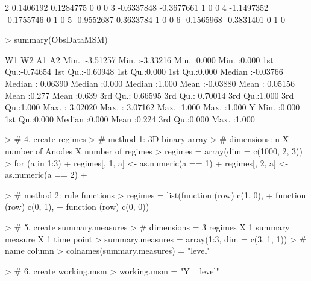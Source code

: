 \documentclass[answers]{exam}
\begin{document}
\begin{solution}
\begin{Schunk}
\begin{Soutput}
2  0.1406192  0.1284775  0  0 0
3 -0.6337848 -0.3677661  1  0 0
4 -1.1497352 -0.1755746  0  1 0
5 -0.9552687  0.3633784  1  0 0
6 -0.1565968 -0.3831401  0  1 0
\end{Soutput}
\begin{Sinput}
> summary(ObsDataMSM)
\end{Sinput}
\begin{Soutput}
       W1                 W2                 A1              A2       
 Min.   :-3.51257   Min.   :-3.33216   Min.   :0.000   Min.   :0.000  
 1st Qu.:-0.74654   1st Qu.:-0.60948   1st Qu.:0.000   1st Qu.:0.000  
 Median :-0.03766   Median : 0.06390   Median :0.000   Median :1.000  
 Mean   :-0.03880   Mean   : 0.05156   Mean   :0.277   Mean   :0.639  
 3rd Qu.: 0.66595   3rd Qu.: 0.70014   3rd Qu.:1.000   3rd Qu.:1.000  
 Max.   : 3.02020   Max.   : 3.07162   Max.   :1.000   Max.   :1.000  
       Y        
 Min.   :0.000  
 1st Qu.:0.000  
 Median :0.000  
 Mean   :0.224  
 3rd Qu.:0.000  
 Max.   :1.000  
\end{Soutput}
\end{Schunk}
\begin{Schunk}
\begin{Sinput}
> # 4. create regimes
> # method 1: 3D binary array
> # dimensions: n X number of Anodes X number of regimes
> regimes = array(dim = c(1000, 2, 3))
> for (a in 1:3) {
+   regimes[, 1, a] <- as.numeric(a == 1)
+   regimes[, 2, a] <- as.numeric(a == 2)
+ }
\end{Sinput}
\end{Schunk}
\begin{Schunk}
\begin{Sinput}
> # method 2: rule functions
> regimes = list(function (row) c(1, 0),
+                function (row) c(0, 1),
+                function (row) c(0, 0))
\end{Sinput}
\end{Schunk}
\begin{Schunk}
\begin{Sinput}
> # 5. create summary.measures
> # dimensions = 3 regimes X 1 summary measure X 1 time point
> summary.measures = array(1:3, dim = c(3, 1, 1))
> # name column
> colnames(summary.measures) = "level"
\end{Sinput}
\end{Schunk}
\begin{Schunk}
\begin{Sinput}
> # 6. create working.msm
> working.msm = "Y ~ level"
\end{Sinput}
\end{Schunk}

\end{solution}
\end{document}
